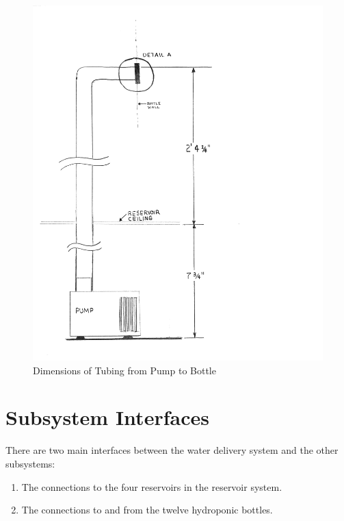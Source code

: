 \documentclass[12pt]{article}
\begin{document}
\pagebreak
\begin{figure}[H]
    \centering
    \includegraphics[width=163mm]{resources/tubing.png}
    \caption{Dimensions of Tubing from Pump to Bottle}
\end{figure}

\section{Subsystem Interfaces}

There are two main interfaces between the water delivery system and the other subsystems:

\begin{enumerate}
    \item The connections to the four reservoirs in the reservoir system.
    \item The connections to and from the twelve hydroponic bottles.
\end{enumerate}
\end{document}
